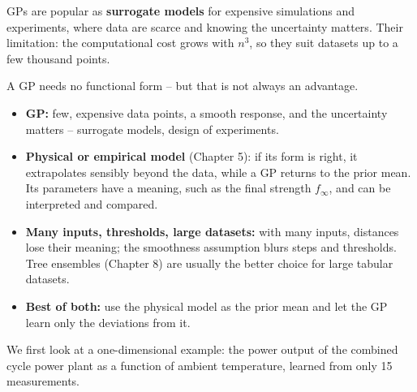 \documentclass[
  letterpaper,
  DIV=11,
  numbers=noendperiod]{scrreprt}
\providecommand{\tightlist}{%
  \setlength{\itemsep}{0pt}\setlength{\parskip}{0pt}}\usepackage{longtable,booktabs,array}
\begin{document}
GPs are popular as \textbf{surrogate models} for expensive simulations
and experiments, where data are scarce and knowing the uncertainty
matters. Their limitation: the computational cost grows with \(n^3\), so
they suit datasets up to a few thousand points.

\begin{tcolorbox}[enhanced jigsaw, left=2mm, title=\textcolor{quarto-callout-tip-color}{\faLightbulb}\hspace{0.5em}{Engineering practice: Gaussian process or a fixed functional form?}, opacityback=0, breakable, rightrule=.15mm, arc=.35mm, toptitle=1mm, colbacktitle=quarto-callout-tip-color!10!white, opacitybacktitle=0.6, coltitle=black, colframe=quarto-callout-tip-color-frame, bottomrule=.15mm, leftrule=.75mm, bottomtitle=1mm, titlerule=0mm, toprule=.15mm, colback=white]

A GP needs no functional form -- but that is not always an advantage.

\begin{itemize}
\tightlist
\item
  \textbf{GP:} few, expensive data points, a smooth response, and the
  uncertainty matters -- surrogate models, design of experiments.
\item
  \textbf{Physical or empirical model} (Chapter 5): if its form is
  right, it extrapolates sensibly beyond the data, while a GP returns to
  the prior mean. Its parameters have a meaning, such as the final
  strength \(f_\infty\), and can be interpreted and compared.
\item
  \textbf{Many inputs, thresholds, large datasets:} with many inputs,
  distances lose their meaning; the smoothness assumption blurs steps
  and thresholds. Tree ensembles (Chapter 8) are usually the better
  choice for large tabular datasets.
\item
  \textbf{Best of both:} use the physical model as the prior mean and
  let the GP learn only the deviations from it.
\end{itemize}

\end{tcolorbox}

We first look at a one-dimensional example: the power output of the
combined cycle power plant as a function of ambient temperature, learned
from only 15 measurements.
\end{document}
